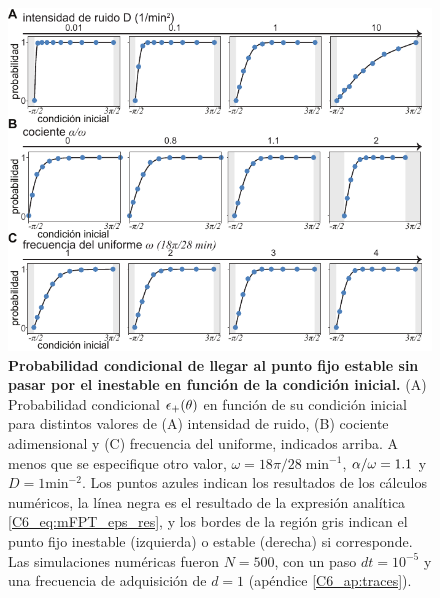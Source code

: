 \documentclass[./main.tex]{subfiles}
\begin{document}
\begin{figure}
    \centering
    \includegraphics[width=1\columnwidth]{figures/chapter6/C6_eps_plus.pdf} 
    \caption{\textbf{Probabilidad condicional de llegar al punto fijo estable sin pasar por el inestable en función de la condición inicial.} (A) Probabilidad condicional $\epsilon_{+}(\theta)$ en función de su condición inicial \xx para distintos valores de (A) intensidad de ruido, (B) cociente adimensional \dddelta y (C) frecuencia del uniforme, indicados arriba. A menos que se especifique otro valor, $\omega = 18\pi/28 \; \text{min}^{-1}$, $\alpha/\omega = 1.1$ y $D=1 \text{min}^{-2}$. Los puntos azules indican los resultados de los cálculos numéricos, la línea negra es el resultado de la expresión analítica \ref{C6_eq:mFPT_eps_res}, y los bordes de la región gris indican el punto fijo inestable (izquierda) o estable (derecha) si corresponde. Las simulaciones numéricas fueron $N=500$, con un paso $dt = 10^{-5}$ y una frecuencia de adquisición de $d=1$ (apéndice \ref{C6_ap:traces}).}
    \label{C6_fig:mFPT_eps}
\end{figure}
\end{document}
